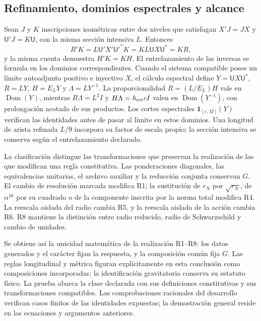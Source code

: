 \subsection{Refinamiento, dominios espectrales y alcance}

Sean \(J\) y \(K\) inscripciones isométricas entre dos niveles que
satisfagan \(X'J=JX\) y \(\mathsf U'J=K\mathsf U\),
con la misma sección intensiva \(L\). Entonces
\[
 R'K=L\mathsf U'X'\mathsf U'^*K
     =KL\mathsf U X\mathsf U^*=KR,
\]
y la misma cuenta demuestra \(H'K=KH\). El entrelazamiento de las
inversas se formula en los dominios correspondientes. Cuando el sistema
compatible posee un límite autoadjunto positivo e inyectivo \(X\),
el cálculo espectral define \(Y=\mathsf U X\mathsf U^*\),
\(R=LY\), \(H=E_{L}Y\) y \(\Lambda=LY^{-1}\). La proporcionalidad
\(R=(L/E_{L})H\) vale en \(\operatorname{Dom}(Y)\), mientras
\(R\Lambda=L^2I\) y \(H\Lambda=\hbar_{\rm ret}cI\) valen en
\(\operatorname{Dom}(Y^{-1})\), con prolongación acotada de sus
productos. Los cortes espectrales
\(\mathbf1_{[\varepsilon,M]}(Y)\) verifican las identidades antes
de pasar al límite en estos dominios. Una longitud de arista refinada
\(L/9\) incorpora su factor de escala propio; la sección intensiva
se conserva según el entrelazamiento declarado.

La clasificación distingue las transformaciones que preservan la
realización de las que modifican una regla constitutiva. Las ponderaciones
diagonales, las equivalencias unitarias, el archivo auxiliar y la reducción
conjunta conservan \(G\). El cambio de resolución marcada modifica R1;
la sustitución de \(r_N\) por \(\sqrt{r_N}\), de
\(\alpha^{16}\) por su cuadrado o de la componente inscrita por la
norma total modifica R4. La reescala aislada del radio cambia R5,
y la reescala aislada de la acción cambia R6. R8 mantiene la distinción
entre radio reducido, radio de Schwarzschild y cambio de unidades.

Se obtiene así la unicidad matemática de la realización R1--R8: los datos
generados y el carácter fijan la respuesta, y la composición común fija
\(G\). Las reglas longitudinal y métrica figuran explícitamente en
esta conclusión como composiciones incorporadas; la identificación
gravitatoria conserva su estatuto físico. La prueba abarca la clase
declarada con sus definiciones constitutivas y sus transformaciones
compatibles. Las comprobaciones racionales del desarrollo verifican
casos finitos de las identidades expuestas; la demostración general
reside en las ecuaciones y argumentos anteriores.

